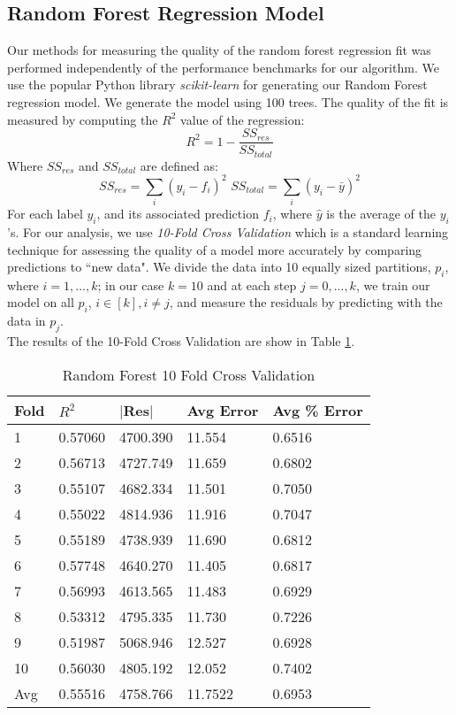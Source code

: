 \documentclass[10.5pt,journal]{IEEEtran}
\begin{document}
	\subsection{Random Forest Regression Model}
		Our methods for measuring the quality of the random forest regression fit was performed independently
		of the performance benchmarks for our algorithm. We use the popular Python library {\it{scikit-learn}}
		\cite{scikit}
		for generating our Random Forest regression model. We generate the model using 100 trees. The quality
		of the fit is measured by computing the $R^2$ value of the regression:
			\[R^2 = 1 - \frac{SS_{res}}{SS_{total}}\]
			Where $SS_{res}$ and $SS_{total}$ are defined as:
			\[SS_{res} = \sum_i (y_i-f_i)^2 \,\, SS_{total} = \sum_i (y_i-\bar{y})^2\]
		For each label $y_i$, and its associated prediction $f_i$, where $\hat{y}$ is the average of
		the $y_i$'s. For our analysis, we use {\it{10-Fold Cross Validation}} which is a standard
		learning technique for assessing the quality of a model more accurately by comparing predictions
		to ``new data". We divide the data into 10 equally sized partitions, $p_i$, where $i=1,...,k$;
		in our case $k=10$ and at each step $j = 0,...,k$, we train our model on all $p_i$, $i\in [k],
		i\ne j$, and measure the residuals by predicting with the data in $p_j$. \\
		
		The results of the 10-Fold Cross Validation are show in Table \ref{fig:crossval_tbl}. \\
		
		\begin{table}[h!] \normalsize
			\caption{Random Forest 10 Fold Cross Validation}
			\centering
			\begin{tabular}{|l|l|l|l|l|} \hline
			Fold    & $R^2$ & $|$Res$|$ & Avg Error    & Avg \% Error \\ \hline 
			1       & 0.57060        & 4700.390  & 11.554 	& 0.6516      \\
			2       & 0.56713        & 4727.749  & 11.659 	& 0.6802        \\
			3       & 0.55107        & 4682.334  & 11.501  	& 0.7050       \\
			4       & 0.55022        & 4814.936  & 11.916 	& 0.7047        \\
			5       & 0.55189        & 4738.939  & 11.690 	& 0.6812        \\
			6       & 0.57748        & 4640.270 & 11.405 	& 0.6817        \\
			7       & 0.56993        & 4613.565  & 11.483 	& 0.6929        \\
			8       & 0.53312        & 4795.335  & 11.730 	& 0.7226        \\
			9       & 0.51987        & 5068.946  & 12.527  	& 0.6928       \\
			10      & 0.56030        & 4805.192  & 12.052  	& 0.7402        \\ \hline
			Avg		& 0.55516        & 4758.766 & 11.7522 	& 0.6953        \\ \hline
			\end{tabular}
			\label{fig:crossval_tbl}
		\end{table}
		
\end{document}
